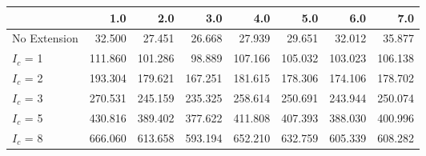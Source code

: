 \begin{tabular}{lrrrrrrr}
\toprule
{} &     1.0 &     2.0 &     3.0 &     4.0 &     5.0 &     6.0 &     7.0 \\
\midrule
No Extension &  32.500 &  27.451 &  26.668 &  27.939 &  29.651 &  32.012 &  35.877 \\
$I_c$ = 1    & 111.860 & 101.286 &  98.889 & 107.166 & 105.032 & 103.023 & 106.138 \\
$I_c$ = 2    & 193.304 & 179.621 & 167.251 & 181.615 & 178.306 & 174.106 & 178.702 \\
$I_c$ = 3    & 270.531 & 245.159 & 235.325 & 258.614 & 250.691 & 243.944 & 250.074 \\
$I_c$ = 5    & 430.816 & 389.402 & 377.622 & 411.808 & 407.393 & 388.030 & 400.996 \\
$I_c$ = 8    & 666.060 & 613.658 & 593.194 & 652.210 & 632.759 & 605.339 & 608.282 \\
\bottomrule
\end{tabular}
